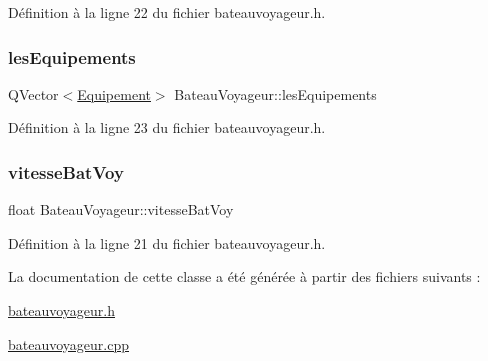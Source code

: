 Définition à la ligne 22 du fichier bateauvoyageur.\+h.

\mbox{\label{class_bateau_voyageur_a570ffdd189b44025d2e8d88e5dcdb1e2}} 
\subsubsection{\texorpdfstring{les\+Equipements}{lesEquipements}}
{\footnotesize\ttfamily Q\+Vector$<$\hyperlink{class_equipement}{Equipement}$>$ Bateau\+Voyageur\+::les\+Equipements\hspace{0.3cm}{\ttfamily [private]}}



Définition à la ligne 23 du fichier bateauvoyageur.\+h.

\mbox{\label{class_bateau_voyageur_a245a2e10cb6264193306f728b0af04cb}} 
\subsubsection{\texorpdfstring{vitesse\+Bat\+Voy}{vitesseBatVoy}}
{\footnotesize\ttfamily float Bateau\+Voyageur\+::vitesse\+Bat\+Voy\hspace{0.3cm}{\ttfamily [private]}}



Définition à la ligne 21 du fichier bateauvoyageur.\+h.



La documentation de cette classe a été générée à partir des fichiers suivants \+:\begin{DoxyCompactItemize}
\item 
\hyperlink{bateauvoyageur_8h}{bateauvoyageur.\+h}\item 
\hyperlink{bateauvoyageur_8cpp}{bateauvoyageur.\+cpp}\end{DoxyCompactItemize}
